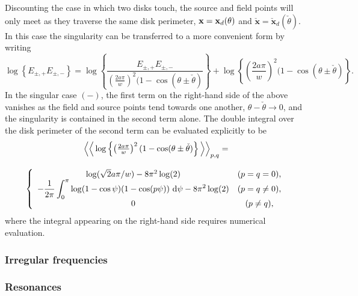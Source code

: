 \documentclass[12pt,a4paper]{article}
\newcommand{\rad}{a}
\newcommand{\bx}{{\bf x}}
\newcommand{\bxo}{\check{\textbf{x}}}
\newcommand{\tho}{\check{\theta}}
\begin{document}
Discounting the case in which two disks touch, the source and field points will only meet as they traverse the same disk perimeter, \ie $\bx=\bx_{d}(\theta)$ and $\bxo=\bxo_{d}(\tho)$.
In this case the singularity can be transferred to a more convenient form by writing
\begin{equation}\nonumber
\log\left\{
E_{\pm,+}
E_{\pm,-}
\right\}
=
\log\left\{
\frac{E_{\pm,+}
E_{\pm,-}}{
\left(\frac{2\rad\pi}{w} \right)^2(1-\cos(\theta\pm \tho)
}
\right\}
+
\log\left\{
\left(
\frac{2\rad\pi}{w} 
\right)^2(1-\cos(\theta\pm \tho)
\right\}
.
\end{equation}
In the singular case $(-)$, the first term on the right-hand side of the above vanishes as the field and source points tend towards one another, \ie $\theta-\tho\to 0$, and the singularity is contained in the second term alone.
The double integral over the disk perimeter of the second term can be evaluated explicitly to be
\begin{equation}
\begin{array}{c}
\Big\langle\Big\langle
\log\left\{
\left(
\frac{2\rad\pi}{w} 
\right)^2(1-\cos(\theta\pm \tho)
\right\}
\Big\rangle\Big\rangle_{p,q}
=
\\[18pt]
\left\{
\begin{array}{c c}
\log(\sqrt{2}\rad\pi/w)
-
8\pi^{2}\log(2)
&
(p=q=0),
\\
\ds
-
\frac{1}{2\pi}
\int_{0}^{\pi}
\log(1-\cos\psi)
(1-\cos(p\psi))
\wrt\psi
-
8\pi^{2}\log(2)
&
(p=q\neq 0),
\\
0 & (p\neq q),
\end{array}
\right.
\end{array}
\end{equation}
where the integral appearing on the right-hand side requires numerical evaluation.

%

\subsubsection{Irregular frequencies}

%

\subsubsection{Resonances}
\end{document}
